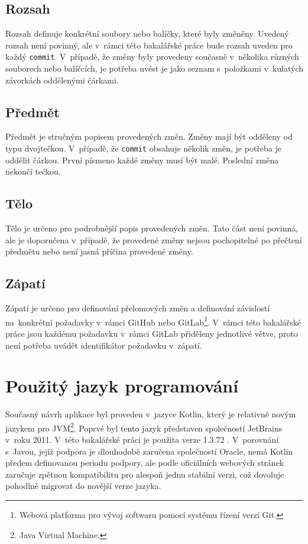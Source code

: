     \subsection{Rozsah}
        Rozsah definuje konkrétní soubory nebo balíčky, které byly změněny. Uvedený rozsah není povinný, ale v~rámci této bakalářské práce bude rozsah uveden pro každý \verb|commit|. V~případě, že změny byly provedeny současně v~několika různých souborech nebo balíčcích, je potřeba uvést je jako seznam s~položkami v~kulatých závorkách oddělenými čárkami.
    
    \subsection{Předmět}
        Předmět je stručným popisem provedených změn. Změny mají být odděleny od typu dvojtečkou. V~případě, že \verb|commit| obsahuje několik změn, je potřeba je oddělit čárkou. První písmeno každé změny musí být malé. Poslední změna nekončí tečkou.
    
    \subsection{Tělo}
        Tělo je určeno pro podrobnější popis provedených změn. Tato část není povinná, ale je doporučena v~případě, že provedené změny nejsou pochopitelné po přečtení předmětu nebo není jasná příčina provedené změny.
    
    \subsection{Zápatí}
        Zápatí je určeno pro definování přelomových změn a definování závislostí na~konkrétní požadavky v~rámci GitHub nebo GitLab\footnote{Webová platforma pro vývoj softwaru pomocí systému řízení verzí Git.}. V~rámci této bakalářské práce jsou každému požadavku v~rámci GitLab přiděleny jednotlivé větve, proto není potřeba uvádět identifikátor požadavku v~zápatí.
    
\section{Použitý jazyk programování}\label{resere:kotlin}
    Současný návrh aplikace byl proveden v~jazyce Kotlin, který je relativně novým jazykem pro JVM\footnote{Java Virtual Machine.}. Poprvé byl tento jazyk představen společností JetBrains v~roku 2011. V~této bakalářské práci je použita verze 1.3.72 . V~porovnání s~Javou, jejíž podpora je dlouhodobě zaručena společností Oracle, nemá Kotlin předem definovanou periodu podpory, ale podle oficiálních webových stránek zaručuje zpětnou kompatibilitu pro alespoň jednu stabilní verzi, což dovoluje pohodlně migrovat do novější verze jazyka.\cite{java-support-period}\cite{kotlin-compatibility}
    
